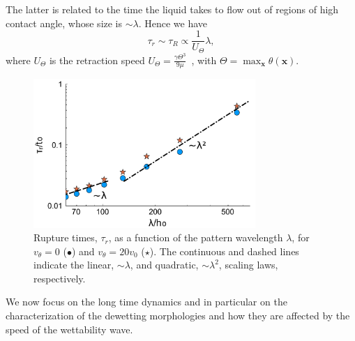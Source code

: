 The latter is related to the time the liquid takes to flow out of regions of high contact angle, whose size is $\sim \lambda$. Hence we have 
\begin{equation}\label{eq:taur_l1}
 \tau_r \sim \tau_R \propto \frac{1}{U_{\Theta}}\lambda,
\end{equation}
where $U_{\Theta}$ is the retraction speed $U_{\Theta} = \frac{\gamma \Theta^3}{9\mu}$~\cite{Edwardse1600183}, with $\Theta = \max_{\mathbf{x}}\theta(\mathbf{x})$.
\begin{figure}
    \centering
    \includegraphics[width=0.75\textwidth]{graphics/Figure_2.pdf}
    \caption{Rupture times, $\tau_r$, as a function of the pattern wavelength $\lambda$, for $v_{\theta}=0$ (\textcolor{jlblue}{$\bullet$}) and $v_{\theta}=20 v_0$ 
    (\textcolor{jlorange}{$\star$}).
    The continuous and dashed lines indicate the linear, $\sim \lambda$, and quadratic, $\sim \lambda^2$, scaling laws, respectively.
        }
    \label{fig:model_rt}
\end{figure}
We now focus on the long time dynamics and in particular on the characterization of the dewetting morphologies and how they are affected by the speed of the wettability wave.
